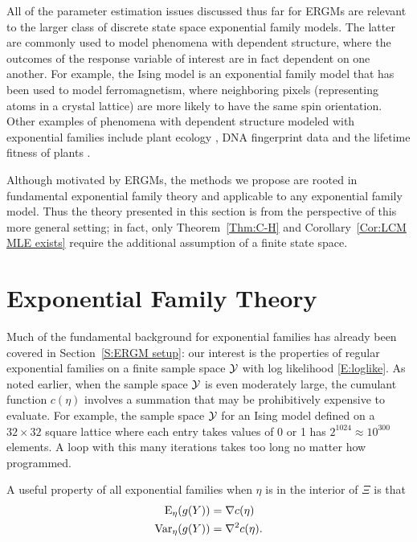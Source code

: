 All of the parameter estimation issues discussed thus far for ERGMs are relevant to 
the larger class of discrete state space exponential family models.
The latter are commonly used to model phenomena with dependent structure, 
where the outcomes of the response variable of interest are in fact dependent on one 
another.  For example, the Ising 
model \citep{Ising,Potts} is an exponential family model that has been used to model 
ferromagnetism, where neighboring 
pixels (representing atoms in a crystal lattice) are more likely to have the same 
spin orientation.  
Other examples of phenomena with dependent structure modeled with exponential 
families include
plant ecology \citep{Besag:1974,Besag:1975}, DNA fingerprint data \citep{Geyer:1992}
 and the lifetime fitness of plants \citep
{Shaw:2008}.

Although motivated by ERGMs, the methods we propose are rooted in fundamental
exponential family theory and applicable to any 
exponential family model.  Thus the theory presented in this section is from
the perspective of this more general setting; in fact, only Theorem~\ref{Thm:C-H} and
Corollary~\ref{Cor:LCM MLE exists} require 
the additional assumption of a finite state space.

\section{Exponential Family Theory}
Much of the fundamental background for exponential families has already been
covered in Section~\ref{S:ERGM setup}: our interest is the properties of
 regular exponential
families on a finite sample space ${\mathcal Y}$  with log likelihood \eqref{E:loglike}.
As noted earlier, when the sample space ${\mathcal Y}$ is even moderately large,
the cumulant function $c(\eta)$ involves a summation that may be prohibitively 
expensive to evaluate.  For example, the sample space ${\mathcal Y}$ for an Ising model 
defined on a $32\times 32$ square lattice where each entry takes values of 0 or 1 
has $2^{1024} \approx 10^{300}$ elements.  
A loop with this many iterations takes too long no matter how programmed.

A useful property of all exponential families \cite[p.~27]{TPE2} when 
$\eta$ is in the interior of $\Xi$ is that 
\begin{align*}
	\operatorname{E}_\eta(g(Y)) &= \nabla c(\eta)	\\
	\operatorname{Var}_\eta(g(Y)) &= \nabla^2 c( \eta ).
\end{align*}

